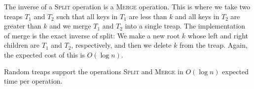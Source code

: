 The inverse of a \textsc{Split} operation is a \textsc{Merge}
operation.  This is where we take two treaps $T_1$ and $T_2$ such that
all keys in $T_1$ are less than $k$ and all keys in $T_2$ are greater
than $k$ and we merge $T_1$ and $T_2$ into a single treap.  The
implementation of merge is the exact inverse of split:  We make a new
root $k$ whose left and right children are $T_1$ and $T_2$,
respectively, and then we delete $k$ from the treap.  Again, the
expected cost of this is $O(\log n)$.

\begin{thm}
Random treaps support the operations \textsc{Split} and \textsc{Merge}
in $O(\log n)$ expected time per operation. 
\end{thm}

%

